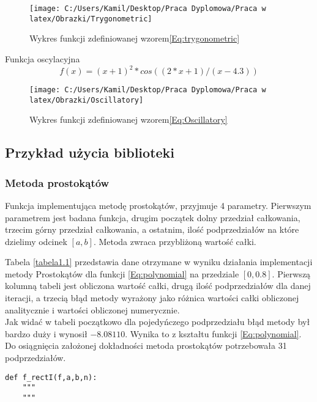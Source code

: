 \documentclass[12pt,twoside]{article}
\begin{document}
\begin{figure}[h]
\texttt{[image: C:/Users/Kamil/Desktop/Praca Dyplomowa/Praca w latex/Obrazki/Trygonometric]}
\caption{Wykres funkcji zdefiniowanej wzorem\eqref{Eq:trygonometric}}
\end{figure}

Funkcja oscylacyjna
\begin{equation}
f(x) = (x+1)^2*cos((2*x+1)/(x-4.3))
\label{Eq:Oscillatory}
\end{equation}

\begin{figure}[h]
\texttt{[image: C:/Users/Kamil/Desktop/Praca Dyplomowa/Praca w latex/Obrazki/Oscillatory]}
\caption{Wykres funkcji zdefiniowanej wzorem\eqref{Eq:Oscillatory}}
\end{figure}

\subsection{Przykład użycia biblioteki}

\subsubsection{Metoda prostokątów}
	Funkcja implementująca metodę prostokątów, przyjmuje 4 parametry. Pierwszym parametrem jest badana funkcja, drugim początek dolny przedział całkowania, trzecim górny przedział całkowania, a ostatnim, ilość podprzedziałów na które dzielimy odcinek $[a,b]$. Metoda zwraca przybliżoną wartość całki.
	
	Tabela \eqref{tabela1.1} przedstawia dane otrzymane w wyniku działania implementacji metody Prostokątów dla funkcji \eqref{Eq:polynomial} na przedziale $[0,0.8]$.
	Pierwszą kolumną tabeli jest obliczona wartość całki, drugą ilość podprzedziałów dla danej iteracji, a trzecią błąd metody wyrażony jako różnica wartości całki obliczonej 			analitycznie i wartości obliczonej numerycznie.\\
	Jak widać w tabeli początkowo dla pojedyńczego podprzedziału błąd metody był bardzo duży i wynosił $-8.08110$. Wynika to z kształtu funkcji \eqref{Eq:polynomial}.\\
	Do osiągnięcia założonej dokładności metoda prostokątów potrzebowała 31 podprzedziałów.
	
\begin{lstlisting}[caption={Kod w języku python implementujący metodę prostokątów}]
def f_rectI(f,a,b,n):
    """
    """
\end{lstlisting}
\label{Listing 6}
\end{document}
